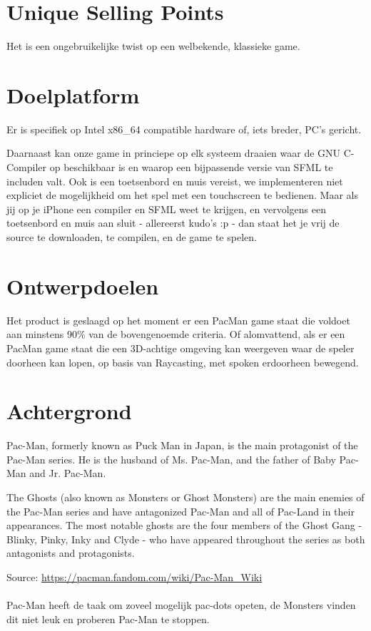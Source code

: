 \documentclass{article}
\begin{document}
\section{Unique Selling Points} %
\label{sec:unique_selling_points}
Het is een ongebruikelijke twist op een welbekende, klassieke game.

\section{Doelplatform} %
\label{sec:doelplatform}
Er is specifiek op Intel x86\_64 compatible hardware of, iets breder, PC's gericht.

Daarnaast kan onze game in princiepe op elk systeem draaien waar de GNU C-Compiler op beschikbaar is en waarop een bijpassende versie van SFML te includen valt. Ook is een toetsenbord en muis vereist, we implementeren niet expliciet de mogelijkheid om het spel met een touchscreen te bedienen. Maar als jij op je iPhone een compiler en SFML weet te krijgen, en vervolgens een toetsenbord en muis aan sluit - allereerst kudo's :p - dan staat het je vrij de source te downloaden, te compilen, en de game te spelen.

\section{Ontwerpdoelen} %
\label{sec:ontwerpdoelen}
Het product is geslaagd op het moment er een PacMan game staat die voldoet aan minstens 90\% van de bovengenoemde criteria. Of alomvattend, als er een PacMan game staat die een 3D-achtige omgeving kan weergeven waar de speler doorheen kan lopen, op basis van Raycasting, met spoken erdoorheen bewegend.

\section{Achtergrond} %
\label{sec:achtergrond}
\begin{quoting}
    Pac-Man, formerly known as Puck Man in Japan, is the main protagonist of the Pac-Man series. He is the husband of Ms. Pac-Man, and the father of Baby Pac-Man and Jr. Pac-Man.

    The Ghosts (also known as Monsters or Ghost Monsters) are the main enemies of the Pac-Man series and have antagonized Pac-Man and all of Pac-Land in their appearances. The most notable ghosts are the four members of the Ghost Gang - Blinky, Pinky, Inky and Clyde - who have appeared throughout the series as both antagonists and protagonists.
\end{quoting}
\small{Source: \url{https://pacman.fandom.com/wiki/Pac-Man_Wiki}}
\\\\
Pac-Man heeft de taak om zoveel mogelijk pac-dots opeten, de Monsters vinden dit niet leuk en proberen Pac-Man te stoppen.
\end{document}

